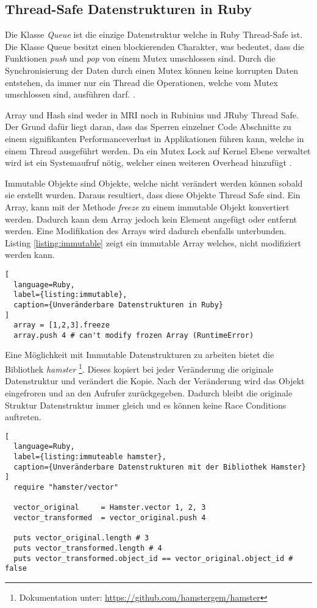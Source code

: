 \subsection{Thread-Safe Datenstrukturen in Ruby}
Die Klasse \emph{Queue} ist die einzige Datenstruktur welche in Ruby Thread-Safe ist. Die Klasse Queue besitzt einen blockierenden Charakter, was bedeutet, dass die Funktionen \emph{push} und \emph{pop} von einem Mutex umschlossen sind. Durch die Synchronisierung der Daten durch einen Mutex können keine korrupten Daten entstehen, da immer nur ein Thread die Operationen, welche vom Mutex umschlossen sind, ausführen darf. \cite[p. 110]{Sto2013}. 

Array und Hash sind weder in MRI noch in Rubinius und JRuby Thread Safe. Der Grund dafür liegt daran, dass das Sperren einzelner Code Abschnitte zu einem signifikanten Performanceverlust in Applikationen führen kann, welche in einem Thread ausgeführt werden. Da ein Mutex Lock auf Kernel Ebene verwaltet wird ist ein Systemaufruf nötig, welcher einen weiteren Overhead hinzufügt \cite[p. 110]{Sto2013}.

Immutable Objekte sind Objekte, welche nicht verändert werden können sobald sie erstellt wurden. Daraus resultiert, dass diese Objekte Thread Safe sind. Ein Array, kann mit der Methode \emph{freeze} zu einem immutable Objekt konvertiert werden. Dadurch kann dem Array jedoch kein Element angefügt oder entfernt werden. Eine Modifikation des Arrays wird dadurch ebenfalls unterbunden. Listing \ref{listing:immutable} zeigt ein immutable Array welches, nicht modifiziert werden kann. 

\begin{lstlisting}[
  language=Ruby,
  label={listing:immutable},
  caption={Unveränderbare Datenstrukturen in Ruby}
]
  array = [1,2,3].freeze
  array.push 4 # can't modify frozen Array (RuntimeError)
\end{lstlisting}

Eine Möglichkeit mit Immutable Datenstrukturen zu arbeiten bietet die Bibliothek \emph{hamster} \footnote{Dokumentation unter: \url{https://github.com/hamstergem/hamster}}. Dieses kopiert bei jeder Veränderung die originale Datenstruktur und verändert die Kopie. Nach der Veränderung wird das Objekt eingefroren und an den Aufrufer zurückgegeben. Dadurch bleibt die originale Struktur Datenstruktur immer gleich und es können keine Race Conditions auftreten. 

\begin{lstlisting}[
  language=Ruby,
  label={listing:immuteable hamster},
  caption={Unveränderbare Datenstrukturen mit der Bibliothek Hamster}
]
  require "hamster/vector"

  vector_original     = Hamster.vector 1, 2, 3
  vector_transformed  = vector_original.push 4

  puts vector_original.length # 3
  puts vector_transformed.length # 4
  puts vector_transformed.object_id == vector_original.object_id # false
\end{lstlisting}

